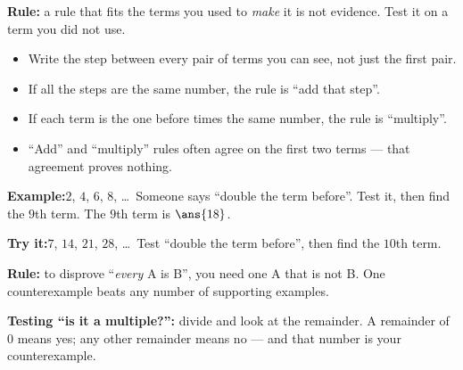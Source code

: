 \documentclass[12pt]{article}
\begin{document}


\begin{formulabox}
\textbf{Rule:} a rule that fits the terms you used to \emph{make} it is not
evidence. Test it on a term you did not use.
\begin{itemize}[leftmargin=0.8cm, itemsep=1pt, topsep=2pt]
  \item Write the step between every pair of terms you can see, not just the first pair.
  \item If all the steps are the same number, the rule is ``add that step''.
  \item If each term is the one before times the same number, the rule is ``multiply''.
  \item ``Add'' and ``multiply'' rules often agree on the first two terms --- that
        agreement proves nothing.
\end{itemize}
\end{formulabox}

\begin{examplebox}
\textbf{Example:}\quad $2$, $4$, $6$, $8$, \ldots\ Someone says ``double the term
before''. Test it, then find the $9$th term.
The $9$th term is $\ans{18}$.
\end{examplebox}

\begin{tryitbox}
\textbf{Try it:}\quad $7$, $14$, $21$, $28$, \ldots\ Test ``double the term
before'', then find the $10$th term.\\[2pt]
\end{tryitbox}


\begin{formulabox}
\textbf{Rule:} to disprove ``\emph{every} A is B'', you need one A that is not B.
One counterexample beats any number of supporting examples.\par
\smallskip
\textbf{Testing ``is it a multiple?'':} divide and look at the remainder.
A remainder of $0$ means yes; any other remainder means no --- and that number is
your counterexample.
\end{formulabox}
\end{document}
